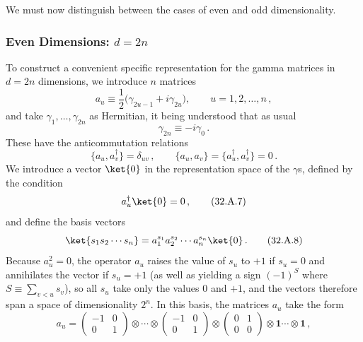 We must now distinguish between the cases of even and odd dimensionality.

\subsubsection*{Even Dimensions: \(d=2n\)}

To construct a convenient specific representation for the gamma matrices in
\(d=2n\) dimensions, we introduce \(n\) matrices
\begin{equation}
  a_u\equiv\frac{1}{2}\bigl(\gamma_{2u-1}+i\gamma_{2u}\bigr),
  \qquad u=1,2,\ldots,n\,,
  \tag{32.A.4}\label{eq:32.A.4}
\end{equation}
and take \(\gamma_1,\ldots,\gamma_{2n}\) as Hermitian, it being understood
that as usual
\begin{equation}
  \gamma_{2n}\equiv-i\gamma_0\,.
  \tag{32.A.5}\label{eq:32.A.5}
\end{equation}
These have the anticommutation relations
\begin{equation}
  \{a_u,a_v^\dagger\}=\delta_{uv}\,,
  \qquad
  \{a_u,a_v\}=\{a_u^\dagger,a_v^\dagger\}=0\,.
  \tag{32.A.6}\label{eq:32.A.6}
\end{equation}
We introduce a vector \(\ket{0}\) in the representation space of the
\(\gamma\)s, defined by the condition
\begin{equation}
  a_u^\dagger\ket{0}=0\,,
  \tag{32.A.7}\label{eq:32.A.7}
\end{equation}
and define the basis vectors
\begin{equation}
  \ket{s_1s_2\cdots s_n}
  =a_1^{s_1}a_2^{s_2}\cdots a_n^{s_n}\ket{0}\,.
  \tag{32.A.8}\label{eq:32.A.8}
\end{equation}
Because \(a_u^2=0\), the operator \(a_u\) raises the value of \(s_u\) to
\(+1\) if \(s_u=0\) and annihilates the vector if \(s_u=+1\) (as well as
yielding a sign \((-1)^S\) where \(S\equiv\sum_{v<u}s_v\)), so all \(s_u\)
take only the values 0 and \(+1\), and the vectors therefore span a space
of dimensionality \(2^n\). In this basis, the matrices \(a_u\) take the
form
\begin{equation}
  a_u=
  \begin{pmatrix}
    -1&0\\
    0&1
  \end{pmatrix}
  \otimes\cdots\otimes
  \begin{pmatrix}
    -1&0\\
    0&1
  \end{pmatrix}
  \otimes
  \begin{pmatrix}
    0&1\\
    0&0
  \end{pmatrix}
  \otimes\mathbf{1}\cdots\otimes\mathbf{1}\,,
  \tag{32.A.9}\label{eq:32.A.9}
\end{equation}
